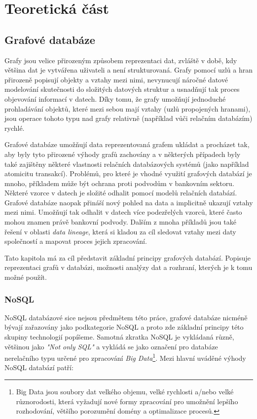 \chapter{Teoretická část}

\section{Grafové databáze}

Grafy jsou velice přirozeným způsobem reprezentaci dat, zvláště v době, kdy většina dat je vytvářena uživateli a není strukturovaná. Grafy pomocí uzlů a hran přirozeně popisují objekty a vztahy mezi nimi, nevynucují náročné datové modelování skutečnosti do složitých datových struktur a usnadňují tak proces objevování informací v datech. Díky tomu, že grafy umožňují jednoduché prohladávání objektů, které mezi sebou mají vztahy (uzlů propojených hranami), jsou operace tohoto typu nad grafy relativně (například vůči relačním databázím) rychlé. 

Grafové databáze umožňují data reprezentovaná grafem ukládat a procházet tak, aby byly tyto přirozené výhody grafů zachovány a v některých případech byly také zajištěny některé vlastnosti relačních databázových systémů (jako například atomicitu transakcí). Problémů, pro které je vhodné využití grafových databází je mnoho, příkladem může být ochrana proti podvodům v bankovním sektoru. Některé vzorce v datech je složité odhalit pomocí modelů relačních databází. Grafové databáze naopak přináší nový pohled na data a implicitně ukazují vztahy mezi nimi. Umožňují tak odhalit v datech více podezřelých vzorců, které často mohou znamen právě bankovní podvody.\cite{Webber17} Dalším z mnoha příkladů jsou také řešení v oblasti \textit{data lineage}, která si kladou za cíl sledovat vztahy mezi daty společností a mapovat proces jejich zpracování. 

Tato kapitola má za cíl představit základní principy grafových databází. Popisuje reprezentaci grafů v databázi, možnosti analýzy dat a rozhraní, kterých je k tomu možné použít.

\subsection{NoSQL}
\label{sec:gdb-nosql}
NoSQL databázové sice nejsou předmětem této práce, grafové databáze nicméně bývají zařazovány jako podkategorie NoSQL a proto zde základní principy této skupiny technologií popíšeme. Samotná zkratka NoSQL je vykládaná různě, většinou jako \textit{"Not only SQL"} \cite{Evans09} a vykládá se jako označení pro databáze nerelačního typu určené pro zpracování \textit{Big Data}\footnote{Big Data jsou soubory dat velkého objemu, velké rychlosti a/nebo velké různorodosti, která vyžadují nové formy zpracování pro umožnění lepšího rozhodování, většího porozumění domény a optimalizace procesů.\cite{Laney01}}. Mezi hlavní uváděné výhody NoSQL databází patří: 

